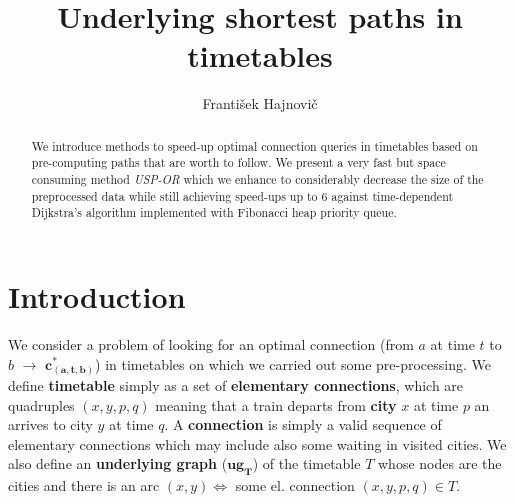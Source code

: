 \documentclass{svk_long_en}
\begin{document}
    \title{Underlying shortest paths in timetables}
	\author{František Hajnovič
	}
	
	
	

	\maketitle

	\begin{abstract}
	We introduce methods to speed-up optimal connection queries in timetables based on pre-computing paths that are worth to follow. We present a very fast but space consuming method \textit{USP-OR} which we enhance to considerably decrease the size of the preprocessed data while still achieving speed-ups up to 6 against time-dependent Dijkstra's algorithm implemented with Fibonacci heap priority queue.
	\end{abstract}

    
\section{Introduction}

	We consider a problem of looking for an optimal connection (from $a$ at time $t$ to $b$ $\rightarrow$ $\bm{c^{*}_{(a, t, b)}}$)  in timetables on which we carried out some pre-processing. We define \textbf{timetable} simply as a set of \textbf{elementary connections}, which are quadruples $(x, y, p, q)$ meaning that a train departs from \textbf{city} $x$ at time $p$ an arrives to city $y$ at time $q$. A \textbf{connection} is simply a valid sequence of elementary connections which may include also some waiting in visited cities. We also define an \textbf{underlying graph} ($\bm{ug_{T}}$) of the timetable $T$ whose nodes are the cities and there is an arc $(x, y) \iff$ some el. connection $(x, y, p, q) \in T$.
\end{document}
